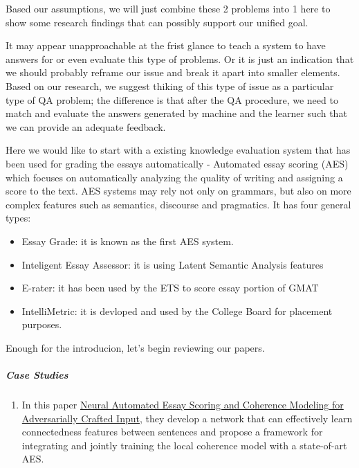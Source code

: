 \documentclass[]{book}
\providecommand{\tightlist}{%
  \setlength{\itemsep}{0pt}\setlength{\parskip}{0pt}}
\let\oldsubparagraph\subparagraph
\renewcommand{\subparagraph}[1]{\oldsubparagraph{#1}\mbox{}}
\theoremstyle{definition}
\theoremstyle{definition}
\theoremstyle{definition}
\theoremstyle{remark}
\begin{document}
Based our assumptions, we will just combine these 2 problems into 1 here
to show some research findings that can possibly support our unified
goal.

It may appear unapproachable at the frist glance to teach a system to
have answers for or even evaluate this type of problems. Or it is just
an indication that we should probably reframe our issue and break it
apart into smaller elements. Based on our research, we suggest thiking
of this type of issue as a particular type of QA problem; the difference
is that after the QA procedure, we need to match and evaluate the
answers generated by machine and the learner such that we can provide an
adequate feedback.

Here we would like to start with a existing knowledge evaluation system
that has been used for grading the essays automatically - Automated
essay scoring (AES) which focuses on automatically analyzing the quality
of writing and assigning a score to the text. AES systems may rely not
only on grammars, but also on more complex features such as semantics,
discourse and pragmatics. It has four general types:

\begin{itemize}
\item
  Essay Grade: it is known as the first AES system.
\item
  Inteligent Essay Assessor: it is using Latent Semantic Analysis
  features
\item
  E-rater: it has been used by the ETS to score essay portion of GMAT
\item
  IntelliMetric: it is devloped and used by the College Board for
  placement purposes.
\end{itemize}

Enough for the introducion, let's begin reviewing our papers.

\subparagraph{Case Studies}\label{case-studies-4}

\begin{enumerate}
\def\labelenumi{\arabic{enumi}.}
\tightlist
\item
  In this paper \href{http://aclweb.org/anthology/N18-1024}{Neural
  Automated Essay Scoring and Coherence Modeling for Adversarially
  Crafted Input}, they develop a network that can effectively learn
  connectedness features between sentences and propose a framework for
  integrating and jointly training the local coherence model with a
  state-of-art AES.
\end{enumerate}
\end{document}
